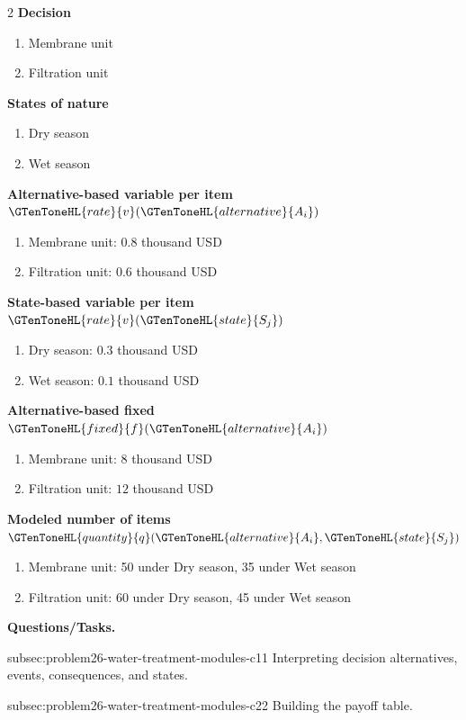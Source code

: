	\begin{multicols}{2}
	\textbf{Decision }
	\begin{enumerate}[label=\arabic*.]
\item Membrane unit
\item Filtration unit
	\end{enumerate}
	\textbf{States of nature}
	\begin{enumerate}[label=\arabic*.]
\item Dry season
\item Wet season
	\end{enumerate}
	\columnbreak
	\textbf{Alternative-based variable  per item $\GTenToneHL{rate}{v}(\GTenToneHL{alternative}{A_i})$}
\begin{enumerate}[label=\arabic*.]
\item Membrane unit: $0.8$ thousand USD
\item Filtration unit: $0.6$ thousand USD\end{enumerate}
\textbf{State-based variable  per item $\GTenToneHL{rate}{v}(\GTenToneHL{state}{S_j})$}
\begin{enumerate}[label=\arabic*.]
\item Dry season: $0.3$ thousand USD
\item Wet season: $0.1$ thousand USD\end{enumerate}
\textbf{Alternative-based fixed  $\GTenToneHL{fixed}{f}(\GTenToneHL{alternative}{A_i})$}
\begin{enumerate}[label=\arabic*.]
\item Membrane unit: $8$ thousand USD
\item Filtration unit: $12$ thousand USD\end{enumerate}
\textbf{Modeled number of items $\GTenToneHL{quantity}{q}(\GTenToneHL{alternative}{A_i},\GTenToneHL{state}{S_j})$}
\begin{enumerate}[label=\arabic*.]
\item Membrane unit: 50 under Dry season, 35 under Wet season
\item Filtration unit: 60 under Dry season, 45 under Wet season
\end{enumerate}
	\end{multicols}

	\textbf{Questions/Tasks.}
	\begin{enumerate}
	\CriterionTask
	{subsec:problem26-water-treatment-modules-c1}{1}
	{Interpreting decision alternatives, events, consequences, and states.}

	\CriterionTask
	{subsec:problem26-water-treatment-modules-c2}{2}
	{Building the payoff table.}
	\end{enumerate}

